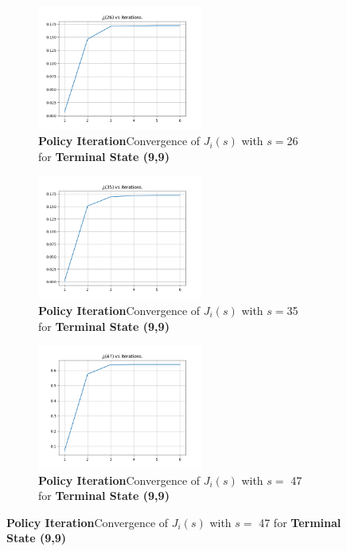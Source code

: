 \begin{figure}[h]
\begin{subfigure}
\centering
\includegraphics[angle=0,width=0.6\textwidth]{hw4/logs/policy_iter_t=99_N=20/convergence-till-6-state-26.png}
\caption{ \textbf{Policy Iteration}Convergence of $J_i(s)$ with $s =$26 for \textbf{Terminal State (9,9)}}
\end{subfigure}

\begin{subfigure}
\centering
\includegraphics[angle=0,width=0.6\textwidth]{hw4/logs/policy_iter_t=99_N=20/convergence-till-6-state-35.png}
\caption{ \textbf{Policy Iteration}Convergence of $J_i(s)$ with $s =$35 for \textbf{Terminal State (9,9)}}
\end{subfigure}

\begin{subfigure}
\centering
\includegraphics[angle=0,width=0.6\textwidth]{hw4/logs/policy_iter_t=99_N=20/convergence-till-6-state-47.png}
\caption{ \textbf{Policy Iteration}Convergence of $J_i(s)$ with $s =$ 47 for \textbf{Terminal State (9,9)}}
\end{subfigure}
\end{figure}

